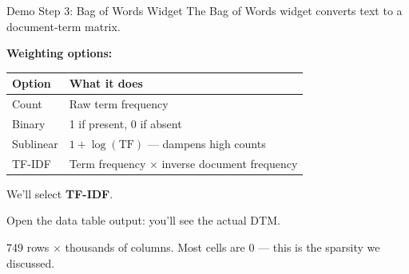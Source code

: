 \documentclass[aspectratio=169,11pt]{beamer}
\begin{document}
\begin{frame}{Demo Step 3: Bag of Words Widget}
    The Bag of Words widget converts text to a document-term matrix.

    \vspace{0.3cm}

    \textbf{Weighting options:}
    \begin{center}
    \begin{tabular}{@{} l l @{}}
        \toprule
        \textbf{Option} & \textbf{What it does} \\
        \midrule
        Count & Raw term frequency \\
        Binary & 1 if present, 0 if absent \\
        Sublinear & $1 + \log(\text{TF})$ --- dampens high counts \\
        TF-IDF & Term frequency $\times$ inverse document frequency \\
        \bottomrule
    \end{tabular}
    \end{center}

    \vspace{0.3cm}

    We'll select \textbf{TF-IDF}.

    \vspace{0.2cm}

    Open the data table output: you'll see the actual DTM.

    749 rows $\times$ thousands of columns. Most cells are 0 --- this is the sparsity we discussed.
\end{frame}
\end{document}
